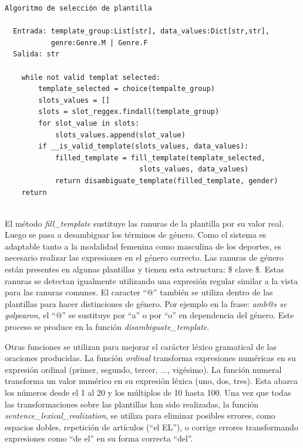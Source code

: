 \begin{verbatim}
Algoritmo de selección de plantilla
    
  Entrada: template_group:List[str], data_values:Dict[str,str], 
           genre:Genre.M | Genre.F
  Salida: str
    
    while not valid templat selected:
        template_selected = choice(tempalte_group)
        slots_values = []
        slots = slot_reggex.findall(template_group)
        for slot_value in slots:
            slots_values.append(slot_value)
        if __is_valid_template(slots_values, data_values):
            filled_template = fill_template(template_selected, 
                                slots_values, data_values)
            return disambiguate_template(filled_template, gender)
    return
    
\end{verbatim}   


  El método \emph{fill\_template} sustituye las ranuras de la plantilla por su valor real. Luego se pasa a desambiguar los términos de género. Como el sistema es 
adaptable tanto a la modalidad femenina como masculina de los deportes, es necesario realizar las expresiones en el género correcto. Las ranuras de género están 
presentes en algunas plantillas y tienen esta estructura: \$ clave \$. Estas ranuras se detectan igualmente utilizando una expresión regular similar a la vista 
para las ranuras comunes. El caracter “@” también se utiliza dentro de las plantillas para hacer distinciones de género. Por ejemplo en la frase: \textit{
amb@s se golpearon}, el “@” se sustituye por “a” o por “o” en dependencia del género. Este proceso se produce en la función \emph{disambiguate\_template}.



Otras funciones se utilizan para mejorar el carácter léxico gramatical de las oraciones producidas. La función \emph{ordinal} transforma expresiones numéricas 
en su expresión ordinal (primer, segundo,  tercer, ..., vigésimo). La función numeral transforma un valor numérico en su expresión léxica (uno, dos, tres). Esta 
abarca los números desde el 1 al 20 y los múltiplos de 10 hasta 100. Una vez que todas las transformaciones sobre las plantillas han sido realizadas, la función 
\emph{sentence\_lexical\_realization}, se utiliza para eliminar posibles errores, como espacios dobles, repetición de artículos (“el EL”), o corrige errores 
transformando expresiones como “de el” en su forma correcta “del”.



